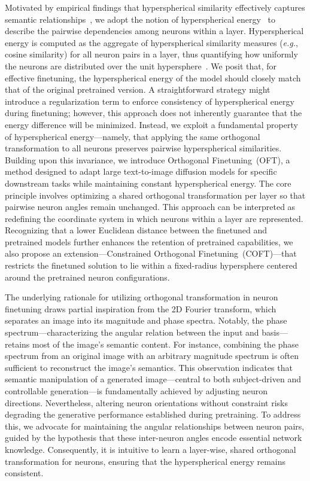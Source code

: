 Motivated by empirical findings that hyperspherical similarity effectively captures semantic relationships~\cite{liu2017deep,liu2018decoupled,chen2020angular}, we adopt the notion of hyperspherical energy~\cite{liu2018learning} to describe the pairwise dependencies among neurons within a layer. Hyperspherical energy is computed as the aggregate of hyperspherical similarity measures (\emph{e.g.}, cosine similarity) for all neuron pairs in a layer, thus quantifying how uniformly the neurons are distributed over the unit hypersphere~\cite{liu2021learning}. We posit that, for effective finetuning, the hyperspherical energy of the model should closely match that of the original pretrained version. A straightforward strategy might introduce a regularization term to enforce consistency of hyperspherical energy during finetuning; however, this approach does not inherently guarantee that the energy difference will be minimized. Instead, we exploit a fundamental property of hyperspherical energy—namely, that applying the same orthogonal transformation to all neurons preserves pairwise hyperspherical similarities. Building upon this invariance, we introduce Orthogonal Finetuning~(OFT), a method designed to adapt large text-to-image diffusion models for specific downstream tasks while maintaining constant hyperspherical energy. The core principle involves optimizing a shared orthogonal transformation per layer so that pairwise neuron angles remain unchanged. This approach can be interpreted as redefining the coordinate system in which neurons within a layer are represented. Recognizing that a lower Euclidean distance between the finetuned and pretrained models further enhances the retention of pretrained capabilities, we also propose an extension—Constrained Orthogonal Finetuning~(COFT)—that restricts the finetuned solution to lie within a fixed-radius hypersphere centered around the pretrained neuron configurations.

The underlying rationale for utilizing orthogonal transformation in neuron finetuning draws partial inspiration from the 2D Fourier transform, which separates an image into its magnitude and phase spectra. Notably, the phase spectrum—characterizing the angular relation between the input and basis—retains most of the image’s semantic content. For instance, combining the phase spectrum from an original image with an arbitrary magnitude spectrum is often sufficient to reconstruct the image’s semantics. This observation indicates that semantic manipulation of a generated image—central to both subject-driven and controllable generation—is fundamentally achieved by adjusting neuron directions. Nevertheless, altering neuron orientations without constraint risks degrading the generative performance established during pretraining. To address this, we advocate for maintaining the angular relationships between neuron pairs, guided by the hypothesis that these inter-neuron angles encode essential network knowledge. Consequently, it is intuitive to learn a layer-wise, shared orthogonal transformation for neurons, ensuring that the hyperspherical energy remains consistent.

